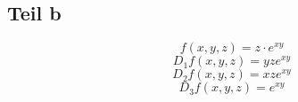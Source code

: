 \documentclass[10pt,a4paper]{article}
\begin{document}
\subsection*{Teil b}

\begin{equation}
f(x, y, z) = z \cdot e^{xy}
\end{equation}
\begin{equation}
D_{1}f(x, y, z) = yze^{xy}
\end{equation}
\begin{equation}
D_{2}f(x, y, z) = xze^{xy}
\end{equation}
\begin{equation}
D_{3}f(x, y, z) = e^{xy}
\end{equation}
\end{document}
